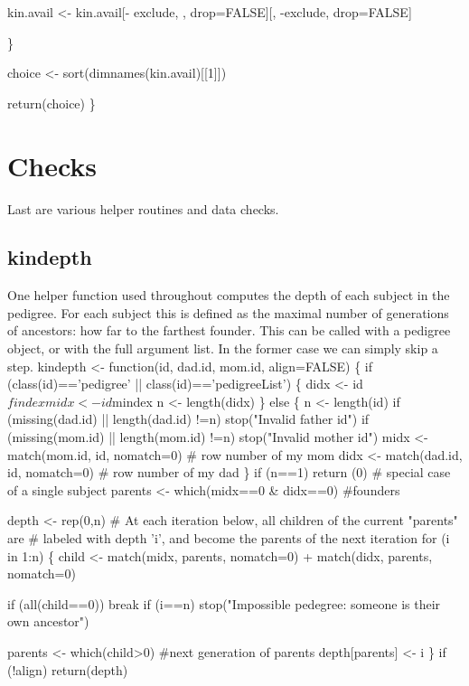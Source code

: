 \documentclass{article}
\begin{document}
      kin.avail <- kin.avail[- exclude, , drop=FALSE][, -exclude, drop=FALSE]

    \}

  choice <- sort(dimnames(kin.avail)[[1]])
  
  return(choice)
\}


\nwendcode{}\nwdocspar

\section{Checks}
Last are various helper routines and data checks.
\subsection{kindepth}
One helper function used throughout computes the depth of
each subject in the pedigree.  
For each subject this is defined as the maximal number of
generations of ancestors: how far to the farthest
founder.  
This can be called with a pedigree object, or with the 
full argument list.  In the former case we can simply
skip a step.
\nwenddocs{}\endmoddef
kindepth <- function(id, dad.id, mom.id, align=FALSE) \{
    if (class(id)=='pedigree' || class(id)=='pedigreeList') \{
        didx <- id$findex
        midx <- id$mindex
        n <- length(didx)
        \} 
    else \{
        n <- length(id)
        if (missing(dad.id) || length(dad.id) !=n)
            stop("Invalid father id")
        if (missing(mom.id) || length(mom.id) !=n)
            stop("Invalid mother id")
        midx <- match(mom.id, id, nomatch=0) # row number of my mom
        didx <- match(dad.id, id, nomatch=0) # row number of my dad
        \}
    if (n==1) return (0)  # special case of a single subject 
    parents <- which(midx==0 & didx==0)  #founders

    depth <- rep(0,n)
    # At each iteration below, all children of the current "parents" are
    #    labeled with depth 'i', and become the parents of the next iteration
    for (i in 1:n) \{
        child  <- match(midx, parents, nomatch=0) +
                  match(didx, parents, nomatch=0)

        if (all(child==0)) break
        if (i==n) 
            stop("Impossible pedegree: someone is their own ancestor")

        parents <- which(child>0) #next generation of parents
        depth[parents] <- i
        \}
    if (!align) return(depth)
\nwendcode{}\nwdocspar
\end{document}

